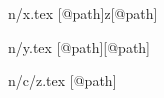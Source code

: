 \begin{filecontents*}{n/x.tex}
[@path]{z}[@path]
\end{filecontents*}
\begin{filecontents*}{n/y.tex}
[@path][@path]
\end{filecontents*}
\begin{filecontents*}{n/c/z.tex}
[@path]
\end{filecontents*}
\documentclass{article}
\usepackage{import}

[@path]

[@path]{y}[@path]

